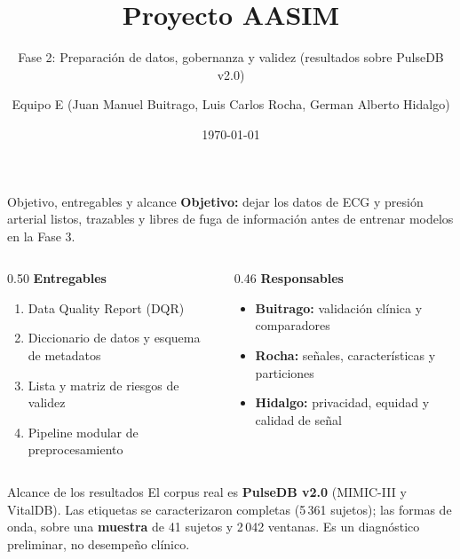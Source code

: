 \documentclass[aspectratio=169]{beamer}
\title{Proyecto AASIM}
\subtitle{Fase 2: Preparación de datos, gobernanza y validez (resultados sobre PulseDB v2.0)}
\author[Equipo E]{Equipo E (Juan Manuel Buitrago, Luis Carlos Rocha, German Alberto Hidalgo)}
\date{\today}
\begin{document}
\begin{frame}
  \titlepage
\end{frame}

\begin{frame}{Objetivo, entregables y alcance}
  \textbf{Objetivo:} dejar los datos de ECG y presión arterial listos, trazables y libres de fuga
  de información antes de entrenar modelos en la Fase 3.

  \vspace{0.5em}
  \begin{columns}[T]
    \begin{column}{0.50\textwidth}
      \textbf{Entregables}
      \begin{enumerate}
        \item Data Quality Report (DQR)
        \item Diccionario de datos y esquema de metadatos
        \item Lista y matriz de riesgos de validez
        \item Pipeline modular de preprocesamiento
      \end{enumerate}
    \end{column}
    \begin{column}{0.46\textwidth}
      \textbf{Responsables}
      \begin{itemize}
        \item \textbf{Buitrago:} validación clínica y comparadores
        \item \textbf{Rocha:} señales, características y particiones
        \item \textbf{Hidalgo:} privacidad, equidad y calidad de señal
      \end{itemize}
    \end{column}
  \end{columns}

  \vspace{0.5em}
  \begin{block}{Alcance de los resultados}
    El corpus real es \textbf{PulseDB v2.0} (MIMIC-III y VitalDB). Las etiquetas se
    caracterizaron completas (5\,361 sujetos); las formas de onda, sobre una
    \textbf{muestra} de 41 sujetos y 2\,042 ventanas. Es un diagnóstico preliminar,
    no desempeño clínico.
  \end{block}
\end{frame}
\end{document}
